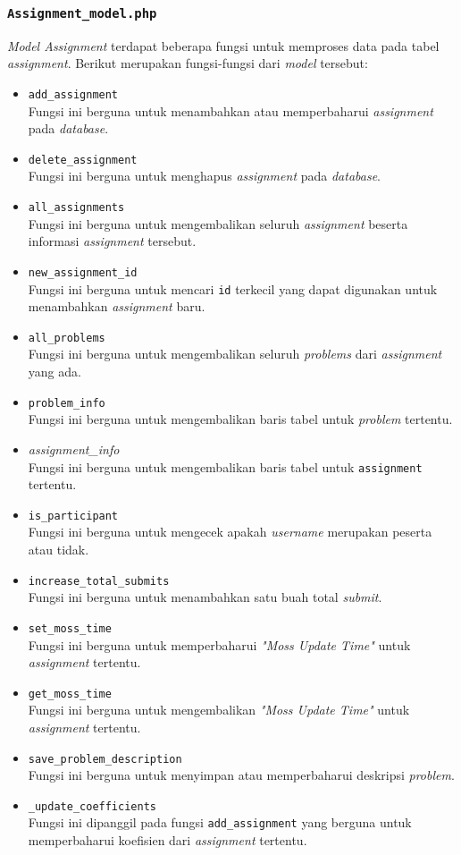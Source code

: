 \subsubsection{\texttt{Assignment\_model.php}}
\textit{Model Assignment} terdapat beberapa fungsi untuk memproses data pada tabel \textit{assignment}. Berikut merupakan fungsi-fungsi dari \textit{model} tersebut:
\begin{itemize}
	\item \texttt{add\_assignment}\\
	Fungsi ini berguna untuk menambahkan atau memperbaharui \textit{assignment} pada \textit{database}.
	\item \texttt{delete\_assignment}\\
	Fungsi ini berguna untuk menghapus \textit{assignment} pada \textit{database}.
	\item \texttt{all\_assignments}\\
	Fungsi ini berguna untuk mengembalikan seluruh \textit{assignment} beserta informasi \textit{assignment} tersebut.
	\item \texttt{new\_assignment\_id}\\
	Fungsi ini berguna untuk mencari \texttt{id} terkecil yang dapat digunakan untuk menambahkan \textit{assignment} baru.
	\item \texttt{all\_problems}\\
	Fungsi ini berguna untuk mengembalikan seluruh \textit{problems} dari \textit{assignment} yang ada.
	\item \texttt{problem\_info}\\
	Fungsi ini berguna untuk mengembalikan baris tabel untuk \textit{problem} tertentu.
	\item \textit{assignment\_info}\\
	Fungsi ini berguna untuk mengembalikan baris tabel untuk \texttt{assignment} tertentu.
	\item \texttt{is\_participant}\\
	Fungsi ini berguna untuk mengecek apakah \textit{username} merupakan peserta atau tidak.
	\item \texttt{increase\_total\_submits}\\
	Fungsi ini berguna untuk menambahkan satu buah total \textit{submit}.
	\item \texttt{set\_moss\_time}\\
	Fungsi ini berguna untuk memperbaharui \textit{"Moss Update Time"} untuk \textit{assignment} tertentu.
	\item \texttt{get\_moss\_time}\\
	Fungsi ini berguna untuk mengembalikan \textit{"Moss Update Time"} untuk \textit{assignment} tertentu.
	\item \texttt{save\_problem\_description}\\
	Fungsi ini berguna untuk menyimpan atau memperbaharui deskripsi \textit{problem}.
	\item \texttt{\_update\_coefficients}\\
	Fungsi ini dipanggil pada fungsi \texttt{add\_assignment} yang berguna untuk memperbaharui koefisien dari \textit{assignment} tertentu.
\end{itemize}
